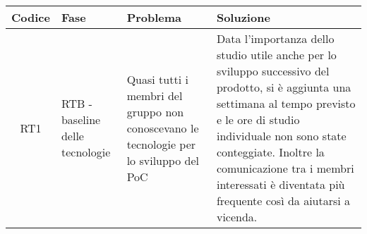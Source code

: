\begin{center}
\renewcommand{\arraystretch}{1.8} %
\begin{longtable}{ |c|p{8em}|p{12em}|p{12em}| }
	\hline
	\textbf{Codice} & \textbf{Fase} & \textbf{Problema} &  \textbf{Soluzione} \\
	\hline
    RT1 & RTB - baseline delle tecnologie & Quasi tutti i membri del gruppo non conoscevano le tecnologie per lo sviluppo del PoC & Data l'importanza dello studio utile anche per lo sviluppo successivo del prodotto, si è aggiunta una settimana al tempo previsto e le ore di studio individuale non sono state conteggiate. \newline Inoltre la comunicazione tra i membri interessati è diventata più frequente così da aiutarsi a vicenda.\\
    \hline
\end{longtable}
\end{center}
\newpage